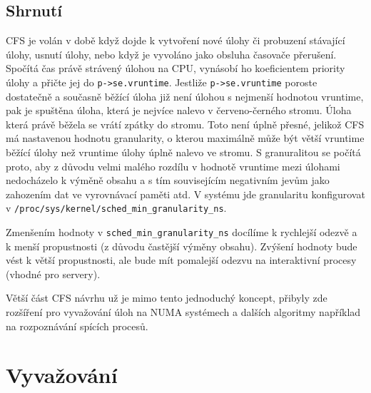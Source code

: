 \documentclass[
  master=true,
  font=sans,
  printversion=false,
  joinlists=true,
  figures=true,
  tables=true,
  sourcecodes=false,
  theorems=false,
  bibencoding=utf8,
  language=czech,
  encoding=utf8,
  field=ainfk,
  biblatex,
  glossaries,
  index
]{kidiplom}
\begin{document}
%
%
%
%
%
%

\subsection{Shrnutí}

CFS je volán v době když dojde k vytvoření nové úlohy či probuzení stávající úlohy, usnutí úlohy, nebo když je vyvoláno jako obsluha časovače přerušení. Spočítá čas právě strávený úlohou na CPU, vynásobí ho koeficientem priority úlohy a přičte jej do \verb#p->se.vruntime#. Jestliže \verb#p->se.vruntime# poroste dostatečně a současně běžící úloha již není úlohou s nejmenší hodnotou vruntime, pak je spuštěna úloha, která je nejvíce nalevo v červeno-černého stromu. Úloha která právě běžela se vrátí zpátky do stromu. Toto není úplně přesné, jelikož CFS má nastavenou hodnotu granularity, o kterou maximálně může být větší vruntime běžící úlohy než vruntime úlohy úplně nalevo ve stromu. S granuralitou se počítá proto, aby z důvodu velmi malého rozdílu v hodnotě vruntime mezi úlohami nedocházelo k výměně obsahu a s tím souvisejícím negativním jevům jako zahozením dat ve vyrovnávací paměti atd.
V systému jde granularitu konfigurovat \newline v \verb#/proc/sys/kernel/sched_min_granularity_ns#. 

Zmenšením hodnoty v \verb#sched_min_granularity_ns# docílíme k rychlejší odezvě a k menší propustnosti (z důvodu častější výměny obsahu). Zvýšení hodnoty bude vést k větší propustnosti, ale bude mít pomalejší odezvu na interaktivní procesy (vhodné pro servery). 

Větší část CFS návrhu už je mimo tento jednoduchý koncept, přibyly zde rozšíření pro vyvažování úloh na NUMA systémech a dalších algoritmy například na rozpoznávání spících procesů.

\section{Vyvažování}
\end{document}
